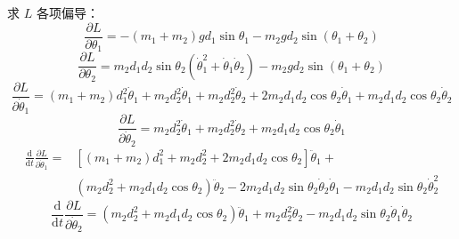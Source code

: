 求 $L$ 各项偏导：
$$\frac{\partial L}{\partial\theta_{1}} = -(m_{1}+m_{2})g d_{1}\sin\theta_{1} - m_{2}g d_{2}\sin(\theta_{1}+\theta_{2})$$
$$\frac{\partial L}{\partial\theta_{2}} = m_{2}d_{1}d_{2}\sin\theta_{2}(\dot{\theta}_{1}^{2}+\dot{\theta}_{1}\dot{\theta}_{2}) - m_{2}g d_{2}\sin(\theta_{1}+\theta_{2})$$
$$\frac{\partial L}{\partial\dot{\theta}_{1}} = (m_{1}+m_{2})d_{1}^{2}\dot{\theta}_{1} + m_{2}d_{2}^{2}\dot{\theta}_{1} + m_{2}d_{2}^{2}\dot{\theta}_{2} + 2m_{2}d_{1}d_{2}\cos\theta_{2}\dot{\theta}_{1} + m_{2}d_{1}d_{2}\cos\theta_{2}\dot{\theta}_{2}$$
$$\frac{\partial L}{\partial\dot{\theta}_{2}} = m_{2}d_{2}^{2}\dot{\theta}_{1} + m_{2}d_{2}^{2}\dot{\theta}_{2} + m_{2}d_{1}d_{2}\cos\theta_{2}\dot{\theta}_{1}$$
$$
\begin{aligned}
    \frac{\mathrm{d}}{\mathrm{d}t}\frac{\partial L}{\partial\dot{\theta}_{1}} = &[(m_{1}+m_{2})d_{1}^{2} + m_{2}d_{2}^{2} + 2m_{2}d_{1}d_{2}\cos\theta_{2}]\ddot{\theta}_{1} + \\
    &(m_{2}d_{2}^{2} + m_{2}d_{1}d_{2}\cos\theta_{2})\ddot{\theta}_{2} - 2m_{2}d_{1}d_{2}\sin\theta_{2}\dot{\theta}_{2}\dot{\theta}_{1} - m_{2}d_{1}d_{2}\sin\theta_{2}\dot{\theta}_{2}^{2}
\end{aligned}
$$
$$\frac{\mathrm{d}}{\mathrm{d}t}\frac{\partial L}{\partial\dot{\theta}_{2}} = (m_{2}d_{2}^{2} + m_{2}d_{1}d_{2}\cos\theta_{2})\ddot{\theta}_{1} + m_{2}d_{2}^{2}\ddot{\theta}_{2} - m_{2}d_{1}d_{2}\sin\theta_{2}\dot{\theta}_{1}\dot{\theta}_{2}$$

